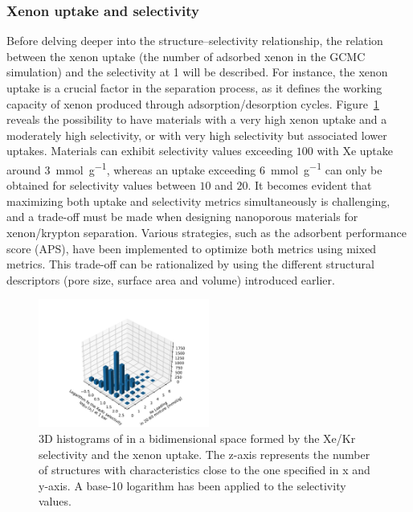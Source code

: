 \documentclass[main.tex]{subfiles}
\begin{document}
\subsubsection{Xenon uptake and selectivity}

Before delving deeper into the structure--selectivity relationship, the relation between the xenon uptake (the number of adsorbed xenon in the GCMC simulation) and the selectivity at \SI{1}{\atm} will be described. For instance, the xenon uptake is a crucial factor in the separation process, as it defines the working capacity of xenon produced through adsorption/desorption cycles. Figure~\ref{fgr:3D_uptake} reveals the possibility to have materials with a very high xenon uptake and a moderately high selectivity, or with very high selectivity but associated lower uptakes. Materials can exhibit selectivity values exceeding $100$ with Xe uptake around \SI{3}{\milli\mole\per\gram}, whereas an uptake exceeding \SI{6}{\milli\mole\per\gram} can only be obtained for selectivity values between $10$ and $20$. It becomes evident that maximizing both uptake and selectivity metrics simultaneously is challenging, and a trade-off must be made when designing nanoporous materials for xenon/krypton separation.\autocite{Zhang_2022} Various strategies, such as the adsorbent performance score (APS),\autocite{Solanki_2020} have been implemented to optimize both metrics using mixed metrics.
This trade-off can be rationalized by using the different structural descriptors (pore size, surface area and volume) introduced earlier. 

\begin{figure}[ht]
  \centering
  \includegraphics[width=0.5\textwidth,trim={2cm 0 2cm 2cm},clip]{figures/2-thermo/3D_hist_selec_uptake.pdf}
  \caption{3D histograms of in a bidimensional space formed by the Xe/Kr selectivity and the xenon uptake. The z-axis represents the number of structures with characteristics close to the one specified in x and y-axis. A base-10 logarithm has been applied to the selectivity values.}\label{fgr:3D_uptake}
\end{figure}
\end{document}
